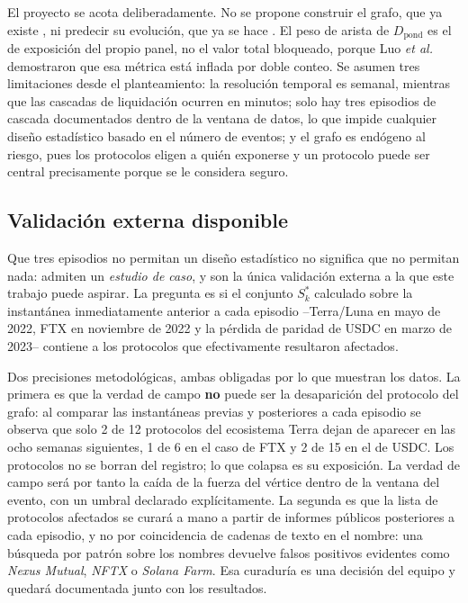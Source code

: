\documentclass[journal]{IEEEtran}
\begin{document}
El proyecto se acota deliberadamente. No se propone construir el grafo, que ya
existe \cite{wu2025dexposure}, ni predecir su evolución, que ya se hace
\cite{shu2026dexposurefm}. El peso de arista de
$D_{\text{pond}}$ es el de exposición del propio panel, no el valor total
bloqueado, porque Luo \emph{et al.} \cite{luo2024piercing} demostraron que esa
métrica está inflada por doble conteo. Se asumen tres limitaciones desde el
planteamiento: la resolución temporal es semanal, mientras que las cascadas de
liquidación ocurren en minutos; solo hay tres episodios de cascada documentados
dentro de la ventana de datos, lo que impide cualquier diseño estadístico basado
en el número de eventos; y el grafo es endógeno al riesgo, pues los protocolos
eligen a quién exponerse y un protocolo puede ser central precisamente porque se
le considera seguro.

\subsection{Validación externa disponible}

Que tres episodios no permitan un diseño estadístico no significa que no
permitan nada: admiten un \emph{estudio de caso}, y son la única validación
externa a la que este trabajo puede aspirar. La pregunta es si el conjunto
$S^{\ast}_k$ calculado sobre la instantánea inmediatamente anterior a cada
episodio --Terra/Luna en mayo de 2022, FTX en noviembre de 2022 y la pérdida de
paridad de USDC en marzo de 2023-- contiene a los protocolos que efectivamente
resultaron afectados.

Dos precisiones metodológicas, ambas obligadas por lo que muestran los datos. La
primera es que la verdad de campo \textbf{no} puede ser la desaparición del
protocolo del grafo: al comparar las instantáneas previas y posteriores a cada
episodio se observa que solo 2 de 12 protocolos del ecosistema Terra dejan de
aparecer en las ocho semanas siguientes, 1 de 6 en el caso de FTX y 2 de 15 en
el de USDC. Los protocolos no se borran del registro; lo que colapsa es su
exposición. La verdad de campo será por tanto la caída de la fuerza del vértice
dentro de la ventana del evento, con un umbral declarado explícitamente. La
segunda es que la lista de protocolos afectados se curará a mano a partir de
informes públicos posteriores a cada episodio, y no por coincidencia de cadenas
de texto en el nombre: una búsqueda por patrón sobre los nombres devuelve falsos
positivos evidentes como \emph{Nexus Mutual}, \emph{NFTX} o \emph{Solana
Farm}. Esa curaduría es una decisión del equipo y quedará documentada junto con
los resultados.
\end{document}
